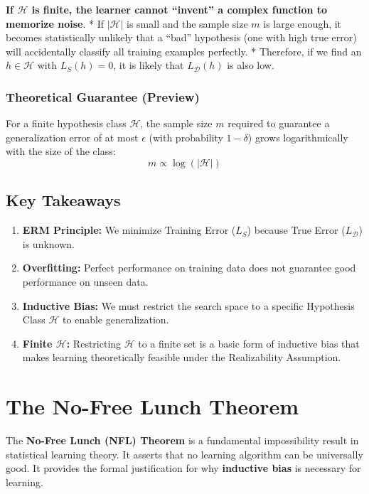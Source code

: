 \documentclass[
  italian,
  11pt,
]{article}
\providecommand{\tightlist}{%
  \setlength{\itemsep}{0pt}\setlength{\parskip}{0pt}}
\begin{document}
\textbf{If \(\mathcal{H}\) is finite, the learner cannot ``invent'' a
complex function to memorize noise}. * If \(|\mathcal{H}|\) is small and
the sample size \(m\) is large enough, it becomes statistically unlikely
that a ``bad'' hypothesis (one with high true error) will accidentally
classify all training examples perfectly. * Therefore, if we find an
\(h \in \mathcal{H}\) with \(L_S(h) = 0\), it is likely that
\(L_{\mathcal{D}}(h)\) is also low.

\subsubsection{Theoretical Guarantee
(Preview)}\label{theoretical-guarantee-preview}

For a finite hypothesis class \(\mathcal{H}\), the sample size \(m\)
required to guarantee a generalization error of at most \(\epsilon\)
(with probability \(1-\delta\)) grows logarithmically with the size of
the class: \[ m \propto \log(|\mathcal{H}|) \]

\subsection{Key Takeaways}\label{key-takeaways-1}

\begin{enumerate}
\def\labelenumi{\arabic{enumi}.}
\tightlist
\item
  \textbf{ERM Principle:} We minimize Training Error (\(L_S\)) because
  True Error (\(L_{\mathcal{D}}\)) is unknown.
\item
  \textbf{Overfitting:} Perfect performance on training data does not
  guarantee good performance on unseen data.
\item
  \textbf{Inductive Bias:} We must restrict the search space to a
  specific Hypothesis Class \(\mathcal{H}\) to enable generalization.
\item
  \textbf{Finite \(\mathcal{H}\):} Restricting \(\mathcal{H}\) to a
  finite set is a basic form of inductive bias that makes learning
  theoretically feasible under the Realizability Assumption.
\end{enumerate}

\newpage

\section{The No-Free Lunch Theorem}\label{the-no-free-lunch-theorem}

The \textbf{No-Free Lunch (NFL) Theorem} is a fundamental impossibility
result in statistical learning theory. It asserts that no learning
algorithm can be universally good. It provides the formal justification
for why \textbf{inductive bias} is necessary for learning.
\end{document}
